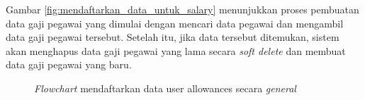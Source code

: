 Gambar \ref{fig:mendaftarkan_data_untuk_salary} menunjukkan proses pembuatan data gaji pegawai yang dimulai dengan mencari data pegawai dan mengambil data gaji pegawai tersebut. Setelah itu, jika data tersebut ditemukan, sistem akan menghapus data gaji pegawai yang lama secara \textit{soft delete} dan membuat data gaji pegawai yang baru.
\begin{figure}[H]
    \centering
    \caption{\textit{Flowchart} mendaftarkan data user allowances secara \textit{general}}
    \label{fig:mendaftarkan_data_user_allowances_secara_general}
\end{figure}

